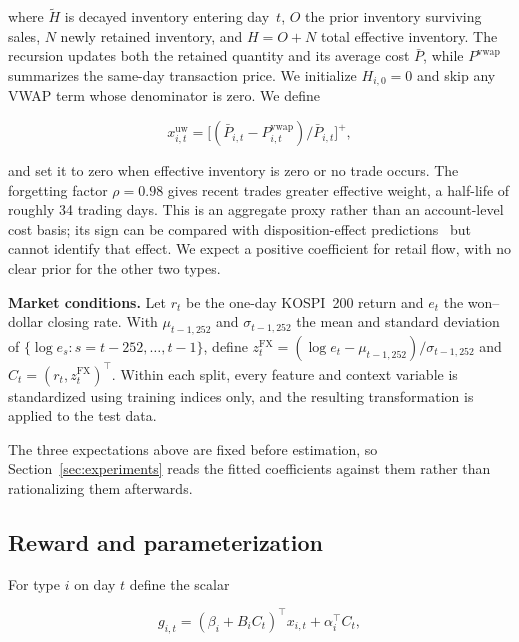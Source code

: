 where $\tilde H$ is decayed inventory entering day~$t$, $O$ the prior
inventory surviving sales, $N$ newly retained inventory, and
$H = O + N$ total effective inventory. The recursion updates both the
retained quantity and its average cost $\bar P$, while
$P^{\mathrm{vwap}}$ summarizes the same-day transaction price. We
initialize $H_{i,0} = 0$ and skip any VWAP term whose denominator is
zero. We define

\begin{equation}
  \label{eq:lossregion}
  x^{\mathrm{uw}}_{i,t} = \bigl[(\bar P_{i,t} - P^{\mathrm{vwap}}_{i,t})
    / \bar P_{i,t}\bigr]^{+},
\end{equation}

and set it to zero when effective inventory is zero or no trade occurs.
The forgetting factor $\rho = 0.98$ gives recent trades greater effective
weight, a half-life of roughly 34 trading days. This is an aggregate
proxy rather than an account-level cost basis; its sign can be compared
with disposition-effect predictions~\cite{shefrin_statman,odean1998} but
cannot identify that effect. We expect a positive coefficient for retail
flow, with no clear prior for the other two types.

\textbf{Market conditions.} Let $r_t$ be the one-day KOSPI~200 return and
$e_t$ the won--dollar closing rate. With $\mu_{t-1,252}$ and
$\sigma_{t-1,252}$ the mean and standard deviation of
$\{\log e_s : s = t-252, \dots, t-1\}$, define
$z^{\mathrm{FX}}_t = (\log e_t - \mu_{t-1,252}) / \sigma_{t-1,252}$ and
$C_t = (r_t, z^{\mathrm{FX}}_t)^{\top}$. Within each split, every feature
and context variable is standardized using training indices only, and the
resulting transformation is applied to the test data.

The three expectations above are fixed before estimation, so
Section~\ref{sec:experiments} reads the fitted coefficients against them
rather than rationalizing them afterwards.

\subsection{Reward and parameterization}
\label{sec:method-reward}

For type $i$ on day $t$ define the scalar

\begin{equation}
  \label{eq:gradient}
  g_{i,t} = (\beta_i + B_i C_t)^{\top} x_{i,t} + \alpha_i^{\top} C_t ,
\end{equation}

